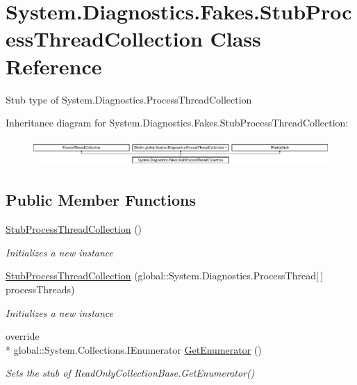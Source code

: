 \hypertarget{class_system_1_1_diagnostics_1_1_fakes_1_1_stub_process_thread_collection}{\section{System.\-Diagnostics.\-Fakes.\-Stub\-Process\-Thread\-Collection Class Reference}
\label{class_system_1_1_diagnostics_1_1_fakes_1_1_stub_process_thread_collection}
}


Stub type of System.\-Diagnostics.\-Process\-Thread\-Collection 


Inheritance diagram for System.\-Diagnostics.\-Fakes.\-Stub\-Process\-Thread\-Collection\-:\begin{figure}[H]
\begin{center}
\leavevmode
\includegraphics[height=1.022831cm]{class_system_1_1_diagnostics_1_1_fakes_1_1_stub_process_thread_collection}
\end{center}
\end{figure}
\subsection*{Public Member Functions}
\begin{DoxyCompactItemize}
\item 
\hyperlink{class_system_1_1_diagnostics_1_1_fakes_1_1_stub_process_thread_collection_a6b06124e55055929f6bb15b03226577d}{Stub\-Process\-Thread\-Collection} ()
\begin{DoxyCompactList}\small\item\em Initializes a new instance\end{DoxyCompactList}\item 
\hyperlink{class_system_1_1_diagnostics_1_1_fakes_1_1_stub_process_thread_collection_a7fd986f9da36c429ca94bf7f88de4605}{Stub\-Process\-Thread\-Collection} (global\-::\-System.\-Diagnostics.\-Process\-Thread\mbox{[}$\,$\mbox{]} process\-Threads)
\begin{DoxyCompactList}\small\item\em Initializes a new instance\end{DoxyCompactList}\item 
override \\*
global\-::\-System.\-Collections.\-I\-Enumerator \hyperlink{class_system_1_1_diagnostics_1_1_fakes_1_1_stub_process_thread_collection_aefb30f360f1b344ca0cac14fa31d6d03}{Get\-Enumerator} ()
\begin{DoxyCompactList}\small\item\em Sets the stub of Read\-Only\-Collection\-Base.\-Get\-Enumerator()\end{DoxyCompactList}\end{DoxyCompactItemize}
